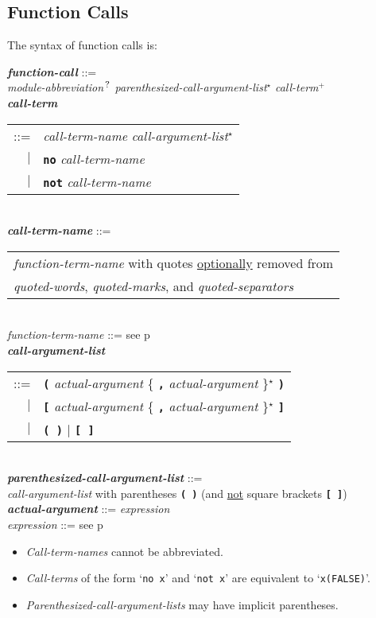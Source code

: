 \documentclass[12pt]{article}
\newcommand{\TT}[1]{{\tt \bfseries #1}}
\newcommand{\STAR}{{\Large $^\star$}}
\newcommand{\PLUS}[1][]{{$^{+#1}$}}
\newcommand{\QMARK}{{$^{\,\mbox{\footnotesize ?}}$}}
\newcommand{\ttkey}[1]{{\tt \bfseries #1}}
\newcommand{\emkey}[1]{{\em \bfseries #1}}
\newcommand{\pagref}[1]{p\pageref{#1}}
\newenvironment{indpar}[1][0.3in]%
	{\begin{list}{}%
		     {\setlength{\itemsep}{0in}%
		      \setlength{\topsep}{0in}%
		      \setlength{\parsep}{1ex}%
		      \setlength{\labelwidth}{#1}%
		      \setlength{\leftmargin}{#1}%
		      \addtolength{\leftmargin}{\labelsep}}%
	 \item}%
	{\end{list}}
\begin{document}
\subsection{Function Calls}
\label{FUNCTION-CALLS}

The syntax of function calls is:

\begin{indpar}
\emkey{function-call}\label{FUNCTION-CALL} ::= \\
\hspace*{0.5in}
        {\em module-abbreviation}\QMARK{}
        {\em parenthesized-call-argument-list}\STAR{}
        {\em call-term}\PLUS{}
\\[0.5ex]
\emkey{call-term}\label{CALL-TERM}
    \begin{tabular}[t]{rl}
    ::= & {\em call-term-name} {\em call-argument-list}\STAR{} \\
    $|$ & \ttkey{no} {\em call-term-name} \\
    $|$ & \ttkey{not} {\em call-term-name} \\
    \end{tabular}
\\[0.5ex]
\emkey{call-term-name}\label{CALL-TERM-NAME} ::=
    \begin{tabular}[t]{@{}l}
    {\em function-term-name} with quotes \underline{optionally} removed from \\
    {\em quoted-words}, {\em quoted-marks}, and {\em quoted-separators}
    \end{tabular}
\\[0.5ex]
{\em function-term-name} ::= see \pagref{FUNCTION-TERM-NAME}
\\[0.5ex]
\emkey{call-argument-list}\label{CALL-ARGUMENT-LIST}
    \begin{tabular}[t]{rl}
    ::= & \TT{(} {\em actual-argument}
          \{ \TT{,} {\em actual-argument} \}\STAR{} \TT{)} \\
    $|$ & \TT{[} {\em actual-argument}
          \{ \TT{,} {\em actual-argument} \}\STAR{} \TT{]} \\
    $|$ & \TT{(~)} $|$ \TT{[~]} \\
    \end{tabular}
\\[0.5ex]
\emkey{parenthesized-call-argument-list}%
    \label{PARENTHESIZED-CALL-ARGUMENT-LIST} ::= \\
\hspace*{0.5in}
    {\em call-argument-list} with parentheses \TT{(~)}
    (and \underline{not} square brackets \TT{[~]})
\\[0.5ex]
\emkey{actual-argument} ::= {\em expression}
\\[0.5ex]
{\em expression} ::= see \pagref{EXPRESSION}
\begin{itemize}
\item {\em Call-term-names} cannot be abbreviated.
\item {\em Call-terms} of the form `{\tt no x}' and `{\tt not x}' are
equivalent to `{\tt x(FALSE)}'.
\item {\em Parenthesized-call-argument-lists} may have implicit
parentheses.
\end{itemize}
\end{indpar}
\end{document}
